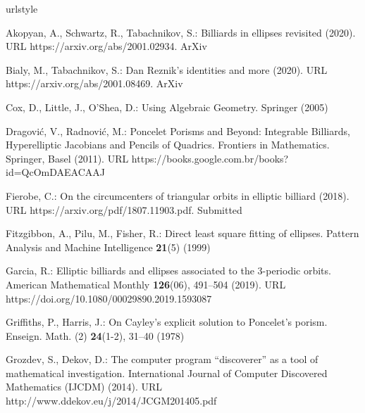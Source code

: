 \begin{thebibliography}{10}
\providecommand{\url}[1]{{#1}}
\providecommand{\urlprefix}{URL }
\expandafter\ifx\csname urlstyle\endcsname\relax
  \providecommand{\doi}[1]{DOI~\discretionary{}{}{}#1}\else
  \providecommand{\doi}{DOI~\discretionary{}{}{}\begingroup
  \urlstyle{rm}\Url}\fi

Akopyan, A., Schwartz, R., Tabachnikov, S.: Billiards in ellipses revisited
  (2020).
\newblock \urlprefix\url{https://arxiv.org/abs/2001.02934}.
\newblock Ar{X}iv

Bialy, M., Tabachnikov, S.: {Dan Reznik's} identities and more (2020).
\newblock \urlprefix\url{https://arxiv.org/abs/2001.08469}.
\newblock Ar{X}iv

Cox, D., Little, J., O'Shea, D.: Using Algebraic Geometry.
\newblock Springer (2005)

Dragovi\'{c}, V., Radnovi\'{c}, M.: Poncelet Porisms and Beyond: Integrable
  Billiards, Hyperelliptic Jacobians and Pencils of Quadrics.
\newblock Frontiers in Mathematics. Springer, Basel (2011).
\newblock \urlprefix\url{https://books.google.com.br/books?id=QcOmDAEACAAJ}

Fierobe, C.: On the circumcenters of triangular orbits in elliptic billiard
  (2018).
\newblock \urlprefix\url{https://arxiv.org/pdf/1807.11903.pdf}.
\newblock Submitted %

Fitzgibbon, A., Pilu, M., Fisher, R.: Direct least square fitting of ellipses.
\newblock Pattern Analysis and Machine Intelligence \textbf{21}(5) (1999)

Garcia, R.: Elliptic billiards and ellipses associated to the 3-periodic
  orbits.
\newblock American Mathematical Monthly \textbf{126}(06), 491--504 (2019).
\newblock \urlprefix\url{https://doi.org/10.1080/00029890.2019.1593087}

Griffiths, P., Harris, J.: On {C}ayley's explicit solution to {P}oncelet's
  porism.
\newblock Enseign. Math. (2) \textbf{24}(1-2), 31--40 (1978)

Grozdev, S., Dekov, D.: The computer program “discoverer” as a tool of
  mathematical investigation.
\newblock International Journal of Computer Discovered Mathematics (IJCDM)
  (2014).
\newblock \urlprefix\url{http://www.ddekov.eu/j/2014/JCGM201405.pdf}


\end{thebibliography}
